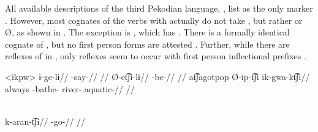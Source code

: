 All available descriptions of the third Pekodian language, \ikpeng, list  as the only  marker \parencites[55]{ikpengpacheco1997}[105]{campetela1997analise}[64]{ikpengpacheco2001}[205]{alves2013verbo}.
However, most \ikpeng cognates of the \arara verbs with   actually do not take , but rather  or Ø, as shown in .
The exception is , which has  .
There is a formally identical \ikpeng cognate of \arara {} , but no first person forms are attested .
Further, while there are reflexes of   in \ikpeng, only  reflexes seem to occur with first person inflectional prefixes \parencite[401]{gildea2018reconstructing}.

\pex<ikpw>\ikpeng
{}
\begingl
\gla ɨ-ge-lɨ//
\glb {}-say-//
\glft {} \parencite[][209]{ikpengpacheco2001}//
\endgl
{}
\begingl
\gla Ø-et͡ʃi-lɨ//
\glb {}-be-//
\glft {} \parencite[][139]{ikpengpacheco2001}//
\endgl
{}
\begingl
\gla at͡ʃagotpop Ø-ip-t͡ʃi ik-gwa-kt͡ʃi//
\glb always -bathe- river-.aquatic-//
\glft {} \parencite[][68]{ikpengpacheco1997}//
\endgl
\xe

\ikpeng \parencite[][80]{ikpengpacheco2001}\\
\begingl
\gla k-aran-t͡ʃi//
\glb {}-go-//
\glft {}//
\endgl
\xe
%
%



